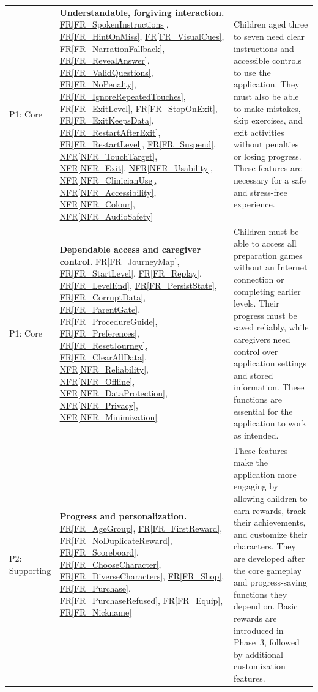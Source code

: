 \documentclass[10pt]{article}
\newcommand{\rref}[1]{\hyperref[#1]{FR\ref*{#1}}}
\newcommand{\nfrref}[1]{\hyperref[#1]{NFR\ref*{#1}}}
\begin{document}
\begin{longtable}{@{}>{\raggedright\arraybackslash}p{}
>{\raggedright\arraybackslash}p{}
>{\raggedright\arraybackslash}p{}@{}}
P1: Core &
\textbf{Understandable, forgiving interaction.}\newline
\rref{FR_SpokenInstructions},
\rref{FR_HintOnMiss},
\rref{FR_VisualCues},
\rref{FR_NarrationFallback},
\rref{FR_RevealAnswer},
\rref{FR_ValidQuestions},
\rref{FR_NoPenalty},
\rref{FR_IgnoreRepeatedTouches},
\rref{FR_ExitLevel},
\rref{FR_StopOnExit},
\rref{FR_ExitKeepsData},
\rref{FR_RestartAfterExit},
\rref{FR_RestartLevel},
\rref{FR_Suspend},
\nfrref{NFR_TouchTarget},
\nfrref{NFR_Exit},
\nfrref{NFR_Usability},
\nfrref{NFR_ClinicianUse},
\nfrref{NFR_Accessibility},
\nfrref{NFR_Colour},
\nfrref{NFR_AudioSafety} &
Children aged three to seven need clear instructions
and accessible controls to use the application.
They must also be able to make mistakes, skip exercises,
and exit activities without penalties or losing progress.
These features are necessary for a safe and
stress-free experience. \\

P1: Core &
\textbf{Dependable access and caregiver control.}\newline
\rref{FR_JourneyMap},
\rref{FR_StartLevel},
\rref{FR_Replay},
\rref{FR_LevelEnd},
\rref{FR_PersistState},
\rref{FR_CorruptData},
\rref{FR_ParentGate},
\rref{FR_ProcedureGuide},
\rref{FR_Preferences},
\rref{FR_ResetJourney},
\rref{FR_ClearAllData},
\nfrref{NFR_Reliability},
\nfrref{NFR_Offline},
\nfrref{NFR_DataProtection},
\nfrref{NFR_Privacy},
\nfrref{NFR_Minimization} &
Children must be able to access all preparation games
without an Internet connection or completing earlier
levels. Their progress must be saved reliably, while
caregivers need control over application settings
and stored information. These functions are essential
for the application to work as intended. \\

P2: Supporting &
\textbf{Progress and personalization.}\newline
\rref{FR_AgeGroup},
\rref{FR_FirstReward},
\rref{FR_NoDuplicateReward},
\rref{FR_Scoreboard},
\rref{FR_ChooseCharacter},
\rref{FR_DiverseCharacters},
\rref{FR_Shop},
\rref{FR_Purchase},
\rref{FR_PurchaseRefused},
\rref{FR_Equip},
\rref{FR_Nickname} &
These features make the application more engaging
by allowing children to earn rewards, track their
achievements, and customize their characters.
They are developed after the core gameplay and
progress-saving functions they depend on.
Basic rewards are introduced in Phase~3,
followed by additional customization features. \\


\end{longtable}
\end{document}
